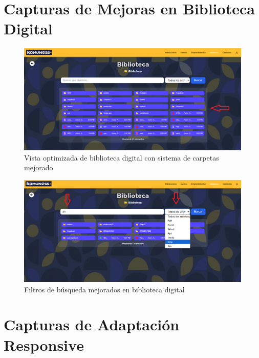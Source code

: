 \section{Capturas de Mejoras en Biblioteca Digital}

\begin{figure}[H]
  \centering
  \includegraphics[width=\textwidth]{project/images/6.10.png}
  \caption{Vista optimizada de biblioteca digital con sistema de carpetas mejorado}
  \label{fig:biblio-vista}
\end{figure}


\begin{figure}[H]
  \centering
  \includegraphics[width=\textwidth]{project/images/6.12}
  \caption{Filtros de búsqueda mejorados en biblioteca digital}
  \label{fig:biblio-filtros}
\end{figure}

\section{Capturas de Adaptación Responsive}

